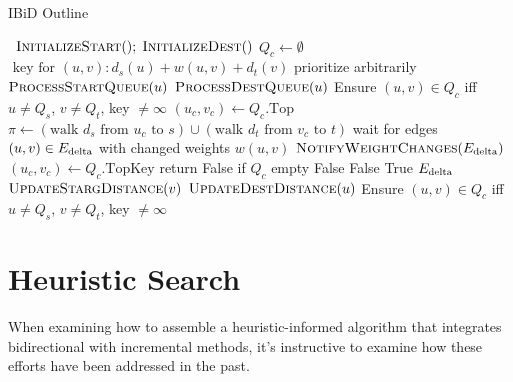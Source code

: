 \begin{algorithm}[t]
   \caption{IBiD Outline}
   \label{alg:ibid}
   \begin{algorithmic}[1]
       {\,}
         \State $\mbox{\sc InitializeStart}(); \; \mbox{\sc InitializeDest}()$
         \State $Q_c \gets \emptyset$
            \Comment $\mbox{ key for } (u,v): d_s(u) + w(u,v) + d_t(v)$
         \Loop
                     \Comment prioritize arbitrarily
                  \State $\mbox{\sc ProcessStartQueue}(u)$
               \Else
                  \State $\mbox{\sc ProcessDestQueue}(u)$
               \EndIf
               \State Ensure $(u,v) \in Q_c$ iff
                  $u \neq Q_s$, $v \neq Q_t$, key $\neq \infty$
            \EndWhile
            \State $(u_c,v_c) \gets Q_c.\mbox{Top}$
            \State $\pi \gets
               ( \mbox{walk } d_s \mbox{ from } u_c \mbox{ to } s )
               \cup
               ( \mbox{walk } d_t \mbox{ from } v_c \mbox{ to } t )$
            \State wait for edges $(u,v) \in E_{\mbox{\scriptsize delta}}$ with changed weights $w(u,v)$
            \State $\mbox{\sc NotifyWeightChanges}(E_{\mbox{\scriptsize delta}})$
         \EndLoop
      \EndProcedure
       {\,}
         \State $(u_c,v_c) \gets Q_c.\mbox{TopKey}$
            \Comment return False if $Q_c$ empty
            \State \Return False
         \EndIf
            \State \Return False
         \EndIf
         \State \Return True
      \EndFunction
       {$E_{\mbox{\scriptsize delta}}$}
            \State $\mbox{\sc UpdateStargDistance}(v)$
            \State $\mbox{\sc UpdateDestDistance}(u)$
         \EndFor
         \State Ensure $(u,v) \in Q_c$ iff
            $u \neq Q_s$, $v \neq Q_t$, key $\neq \infty$
      \EndProcedure
   \end{algorithmic}
\end{algorithm}


\section{Heuristic Search}
\label{sec:ibid:heuristic}

When examining how to assemble a heuristic-informed algorithm
that integrates bidirectional with incremental methods,
it's instructive to examine how these efforts have been addressed
in the past.


